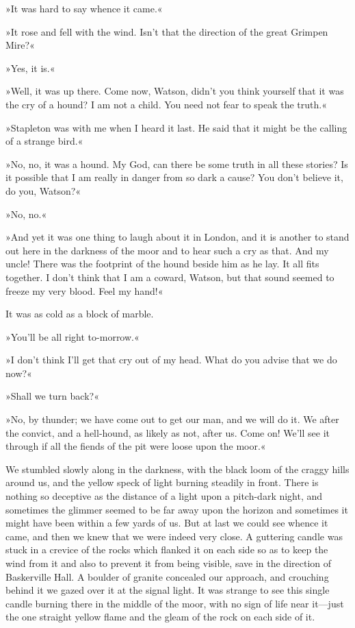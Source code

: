 »It was hard to say whence it came.«

»It rose and fell with the wind. Isn't that the direction of the great Grimpen Mire?«

»Yes, it is.«

»Well, it was up there. Come now, Watson, didn't you think yourself that it was the cry of a hound? I am not a child. You need not fear to speak the truth.«

»Stapleton was with me when I heard it last. He said that it might be the calling of a strange bird.«

»No, no, it was a hound. My God, can there be some truth in all these stories? Is it possible that I am really in danger from so dark a cause? You don't believe it, do you, Watson?«

»No, no.«

»And yet it was one thing to laugh about it in London, and it is another to stand out here in the darkness of the moor and to hear such a cry as that. And my uncle! There was the footprint of the hound beside him as he lay. It all fits together. I don't think that I am a coward, Watson, but that sound seemed to freeze my very blood. Feel my hand!«

It was as cold as a block of marble.

»You'll be all right to-morrow.«

»I don't think I'll get that cry out of my head. What do you advise that we do now?«

»Shall we turn back?«

»No, by thunder; we have come out to get our man, and we will do it. We after the convict, and a hell-hound, as likely as not, after us. Come on! We'll see it through if all the fiends of the pit were loose upon the moor.«

We stumbled slowly along in the darkness, with the black loom of the craggy hills around us, and the yellow speck of light burning steadily in front. There is nothing so deceptive as the distance of a light upon a pitch-dark night, and sometimes the glimmer seemed to be far away upon the horizon and sometimes it might have been within a few yards of us. But at last we could see whence it came, and then we knew that we were indeed very close. A guttering candle was stuck in a crevice of the rocks which flanked it on each side so as to keep the wind from it and also to prevent it from being visible, save in the direction of Baskerville Hall. A boulder of granite concealed our approach, and crouching behind it we gazed over it at the signal light. It was strange to see this single candle burning there in the middle of the moor, with no sign of life near it—just the one straight yellow flame and the gleam of the rock on each side of it.



